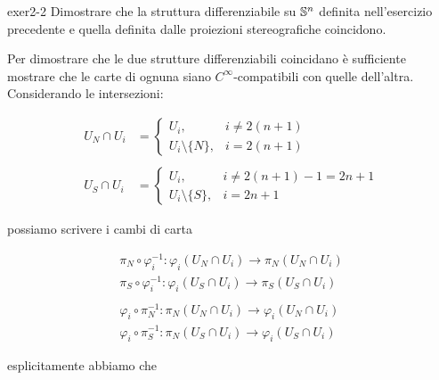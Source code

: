 
{exer2-2}
{
Dimostrare che la struttura differenziabile su $ \S^{n} $ definita nell’esercizio precedente e quella definita dalle proiezioni stereografiche coincidono.
}
{
Per dimostrare che le due strutture differenziabili coincidano è sufficiente mostrare che le carte di ognuna siano $ C^{\infty} $-compatibili con quelle dell'altra. \\
Considerando le intersezioni:

\begin{align}
	U_{N} \cap U_{i} &= %
	\begin{cases}
		U_{i}, & i \neq 2(n+1) \\
		U_{i} \setminus \{ N \}, & i = 2(n+1)
	\end{cases} \\
	\nonumber \\
	U_{S} \cap U_{i} &= %
	\begin{cases}
		U_{i}, & i \neq 2(n+1) - 1 = 2 n + 1 \\
		U_{i} \setminus \{ S \}, & i = 2n+1
	\end{cases}
\end{align}

possiamo scrivere i cambi di carta

\begin{gather}
	\pi_{N} \circ \varphi_{i}^{-1} : \varphi_{i}(U_{N} \cap U_{i}) \to \pi_{N}(U_{N} \cap U_{i}) \\
	\pi_{S} \circ \varphi_{i}^{-1} : \varphi_{i}(U_{S} \cap U_{i}) \to \pi_{S}(U_{S} \cap U_{i}) \\
	\nonumber \\
	\varphi_{i} \circ \pi_{N}^{-1} : \pi_{N}(U_{N} \cap U_{i}) \to \varphi_{i}(U_{N} \cap U_{i}) \\
	\varphi_{i} \circ \pi_{S}^{-1} : \pi_{N}(U_{S} \cap U_{i}) \to \varphi_{i}(U_{S} \cap U_{i})
\end{gather}

esplicitamente abbiamo che

}
